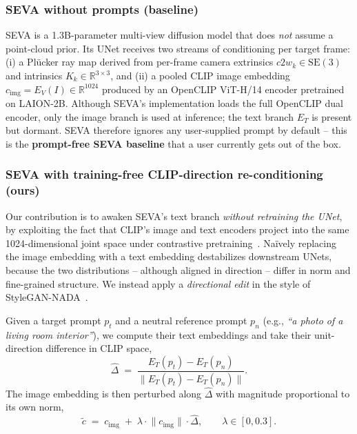\documentclass{article}
\begin{document}
\subsubsection{SEVA without prompts (baseline)}
\label{sec:method-seva-baseline}

SEVA is a 1.3B-parameter multi-view diffusion model that does
\emph{not} assume a point-cloud prior. Its UNet receives two streams of
conditioning per target frame: (i) a Pl\"ucker ray map derived from
per-frame camera extrinsics $c2w_k \in \mathrm{SE}(3)$ and intrinsics
$K_k \in \mathbb{R}^{3 \times 3}$, and (ii) a pooled CLIP image embedding
$c_{\mathrm{img}} = E_V(I) \in \mathbb{R}^{1024}$ produced by an
OpenCLIP ViT-H/14 encoder pretrained on LAION-2B. Although SEVA's
implementation loads the full OpenCLIP dual encoder, only the image
branch is used at inference; the text branch $E_T$ is present but
dormant. SEVA therefore ignores any user-supplied prompt by default --
this is the \textbf{prompt-free SEVA baseline} that a user currently
gets out of the box.

\subsubsection{SEVA with training-free CLIP-direction re-conditioning (ours)}
\label{sec:method-seva-clip}

Our contribution is to awaken SEVA's text branch \emph{without
retraining the UNet}, by exploiting the fact that CLIP's image and text
encoders project into the same 1024-dimensional joint space under
contrastive pretraining~\cite{clip}. Na\"ively replacing the image
embedding with a text embedding destabilizes downstream UNets, because
the two distributions -- although aligned in direction -- differ in norm
and fine-grained structure. We instead apply a \emph{directional edit}
in the style of StyleGAN-NADA~\cite{stylegan_nada}.

Given a target prompt $p_t$ and a neutral reference prompt $p_n$ (e.g.,
\textit{``a photo of a living room interior''}), we compute their text
embeddings and take their unit-direction difference in CLIP space,
\begin{equation}
\hat{\Delta}
\;=\;
\frac{E_T(p_t) - E_T(p_n)}{\lVert E_T(p_t) - E_T(p_n) \rVert}.
\label{eq:clip-direction}
\end{equation}
The image embedding is then perturbed along $\hat{\Delta}$ with
magnitude proportional to its own norm,
\begin{equation}
\tilde{c}
\;=\;
c_{\mathrm{img}}
\;+\;
\lambda \cdot \lVert c_{\mathrm{img}} \rVert \cdot \hat{\Delta},
\qquad
\lambda \in [0, 0.3].
\label{eq:clip-reconditioning}
\end{equation}
\end{document}
